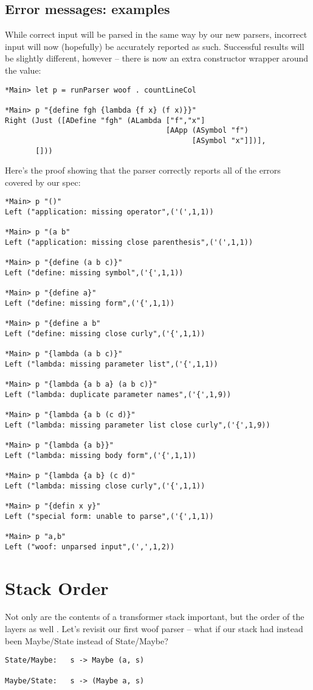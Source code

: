 \documentclass{tmr}
\begin{document}
\subsection{Error messages:  examples}
While correct input will be parsed in the same way by our new parsers, incorrect input will now (hopefully) be
accurately reported as such.  Successful results will be slightly different, however -- there is now an extra
constructor wrapper around the value:
\begin{verbatim}
*Main> let p = runParser woof . countLineCol

*Main> p "{define fgh {lambda {f x} (f x)}}"
Right (Just ([ADefine "fgh" (ALambda ["f","x"] 
                                     [AApp (ASymbol "f") 
                                           [ASymbol "x"]])],
       []))
\end{verbatim}
Here's the proof showing that the parser correctly reports all of the errors 
covered by our spec:
\begin{verbatim}
*Main> p "()"
Left ("application: missing operator",('(',1,1))

*Main> p "(a b"
Left ("application: missing close parenthesis",('(',1,1))

*Main> p "{define (a b c)}"
Left ("define: missing symbol",('{',1,1))

*Main> p "{define a}"
Left ("define: missing form",('{',1,1))

*Main> p "{define a b"
Left ("define: missing close curly",('{',1,1))

*Main> p "{lambda (a b c)}"
Left ("lambda: missing parameter list",('{',1,1))

*Main> p "{lambda {a b a} (a b c)}"
Left ("lambda: duplicate parameter names",('{',1,9))

*Main> p "{lambda {a b (c d)}"
Left ("lambda: missing parameter list close curly",('{',1,9))

*Main> p "{lambda {a b}}"
Left ("lambda: missing body form",('{',1,1))

*Main> p "{lambda {a b} (c d)"
Left ("lambda: missing close curly",('{',1,1))

*Main> p "{defin x y}"
Left ("special form: unable to parse",('{',1,1))

*Main> p "a,b"
Left ("woof: unparsed input",(',',1,2))
\end{verbatim}




\section{Stack Order}
Not only are the contents of a transformer stack important, but the order of the
layers as well \cite{stack}.  Let's revisit our first woof parser -- what if our stack had
instead been Maybe/State instead of State/Maybe?
\begin{verbatim}
State/Maybe:   s -> Maybe (a, s)

Maybe/State:   s -> (Maybe a, s)
\end{verbatim}
\end{document}
